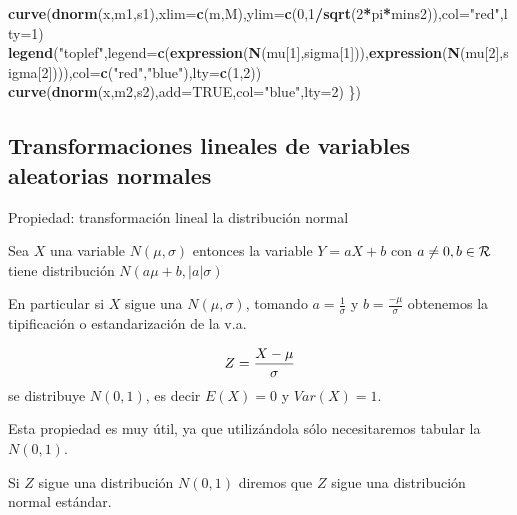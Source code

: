 \documentclass[]{book}
\newenvironment{Shaded}{\begin{snugshade}}{\end{snugshade}}
\newcommand{\DataTypeTok}[1]{\textcolor[rgb]{0.13,0.29,0.53}{#1}}
\newcommand{\DecValTok}[1]{\textcolor[rgb]{0.00,0.00,0.81}{#1}}
\newcommand{\KeywordTok}[1]{\textcolor[rgb]{0.13,0.29,0.53}{\textbf{#1}}}
\newcommand{\NormalTok}[1]{#1}
\newcommand{\OperatorTok}[1]{\textcolor[rgb]{0.81,0.36,0.00}{\textbf{#1}}}
\newcommand{\OtherTok}[1]{\textcolor[rgb]{0.56,0.35,0.01}{#1}}
\newcommand{\StringTok}[1]{\textcolor[rgb]{0.31,0.60,0.02}{#1}}
\begin{document}
\begin{Shaded}
\begin{Highlighting}[]
\KeywordTok{curve}\NormalTok{(}\KeywordTok{dnorm}\NormalTok{(x,m1,s1),}\DataTypeTok{xlim=}\KeywordTok{c}\NormalTok{(m,M),}\DataTypeTok{ylim=}\KeywordTok{c}\NormalTok{(}\DecValTok{0}\NormalTok{,}\DecValTok{1}\OperatorTok{/}\KeywordTok{sqrt}\NormalTok{(}\DecValTok{2}\OperatorTok{*}\NormalTok{pi}\OperatorTok{*}\NormalTok{mins2)),}\DataTypeTok{col=}\StringTok{"red"}\NormalTok{,}\DataTypeTok{lty=}\DecValTok{1}\NormalTok{)}
\KeywordTok{legend}\NormalTok{(}\StringTok{"toplef"}\NormalTok{,}\DataTypeTok{legend=}\KeywordTok{c}\NormalTok{(}\KeywordTok{expression}\NormalTok{(}\KeywordTok{N}\NormalTok{(mu[}\DecValTok{1}\NormalTok{],sigma[}\DecValTok{1}\NormalTok{])),}\KeywordTok{expression}\NormalTok{(}\KeywordTok{N}\NormalTok{(mu[}\DecValTok{2}\NormalTok{],sigma[}\DecValTok{2}\NormalTok{]))),}\DataTypeTok{col=}\KeywordTok{c}\NormalTok{(}\StringTok{"red"}\NormalTok{,}\StringTok{"blue"}\NormalTok{),}\DataTypeTok{lty=}\KeywordTok{c}\NormalTok{(}\DecValTok{1}\NormalTok{,}\DecValTok{2}\NormalTok{))}
\KeywordTok{curve}\NormalTok{(}\KeywordTok{dnorm}\NormalTok{(x,m2,s2),}\DataTypeTok{add=}\OtherTok{TRUE}\NormalTok{,}\DataTypeTok{col=}\StringTok{"blue"}\NormalTok{,}\DataTypeTok{lty=}\DecValTok{2}\NormalTok{)}
\NormalTok{\})}
\end{Highlighting}
\end{Shaded}

\hypertarget{transformaciones-lineales-de-variables-aleatorias-normales}{%
\subsection{Transformaciones lineales de variables aleatorias normales}\label{transformaciones-lineales-de-variables-aleatorias-normales}}

 Propiedad: transformación lineal la distribución normal

Sea \(X\) una variable \(N(\mu,\sigma)\) entonces la variable \(Y=a X+b\) con
\(a\not=0,b\in\cal{R}\) tiene distribución \(N(a\mu+b, |a| \sigma)\)

En particular si \(X\) sigue una \(N(\mu,\sigma)\), tomando \(a=\frac1{\sigma}\) y \(b= \frac{-\mu}{\sigma}\) obtenemos la tipificación o estandarización de la v.a.

\[Z={{X-\mu}\over {\sigma}}\]
se distribuye \(N(0,1)\), es decir \(E(X)=0\) y \(Var(X)=1\).

Esta propiedad es muy útil, ya que utilizándola sólo necesitaremos tabular la
\(N(0,1)\).

Si \(Z\) sigue una distribución \(N(0,1)\) diremos que \(Z\) sigue una distribución normal estándar.
\end{document}
